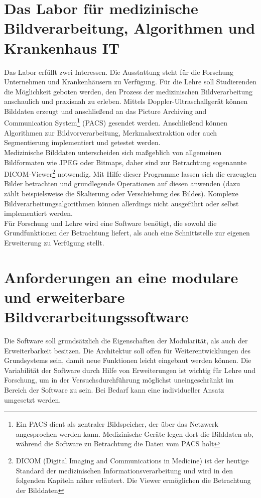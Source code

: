 \section{Das Labor für medizinische Bildverarbeitung, Algorithmen und Krankenhaus IT}\label{einleitung:labor}
Das Labor erfüllt zwei Interessen. Die Ausstattung steht für die Forschung Unternehmen und Krankenhäusern zu Verfügung.
Für die Lehre soll Studierenden die Möglichkeit geboten werden, den Prozess der medizinischen Bildverarbeitung anschaulich und praxisnah zu erleben. Mittels Doppler-Ultraschallgerät können Bilddaten erzeugt und anschließend an das Picture Archiving and Communication System\footnote{Ein PACS dient als zentraler Bildspeicher, der über das Netzwerk angesprochen werden kann. Medizinische Geräte legen dort die Bilddaten ab, während die Software zu Betrachtung die Daten vom PACS holt} (PACS) gesendet werden. Anschließend können Algorithmen zur Bildvorverarbeitung, Merkmalsextraktion oder auch Segmentierung implementiert und getestet werden.\\
Medizinische Bilddaten unterscheiden sich maßgeblich von allgemeinen Bildformaten wie JPEG oder Bitmaps, daher sind zur Betrachtung sogenannte DICOM-Viewer\footnote{DICOM (Digital Imaging and Communications in Medicine) ist der heutige Standard der medizinischen Informationsverarbeitung und wird in den folgenden Kapiteln näher erläutert. Die Viewer ermöglichen die Betrachtung der Bilddaten} notwendig. Mit Hilfe dieser Programme lassen sich die erzeugten Bilder betrachten und grundlegende Operationen auf diesen anwenden (dazu zählt beispielsweise die Skalierung oder Verschiebung des Bildes). Komplexe Bildverarbeitungsalgorithmen können allerdings nicht ausgeführt oder selbst implementiert werden.\\
Für Forschung und Lehre wird eine Software benötigt, die sowohl die Grundfunktionen der Betrachtung liefert, als auch eine Schnittstelle zur eigenen Erweiterung zu Verfügung stellt.

\section{Anforderungen an eine modulare und erweiterbare Bildverarbeitungssoftware}\label{einleitung:anforderungen}

Die Software soll grundsätzlich die Eigenschaften der Modularität, als auch der Erweiterbarkeit besitzen. Die Architektur soll offen für Weiterentwicklungen des Grundsystems sein, damit neue Funktionen leicht eingebaut werden können. Die Variabilität der Software durch Hilfe von Erweiterungen ist wichtig für Lehre und Forschung, um in der Versuchsdurchführung möglichst uneingeschränkt im Bereich der Software zu sein. Bei Bedarf kann eine individueller Ansatz umgesetzt werden.\\
       
